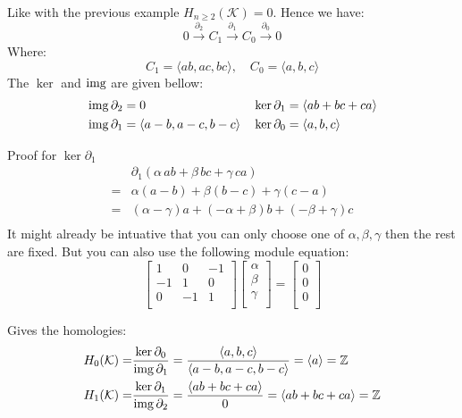 Like with the previous example $H_{n\geq 2}(\mathcal{K}) = 0$.
Hence we have:
\[0 \stackrel{\partial_2}{\longrightarrow} C_1 \stackrel{\partial_1}{\longrightarrow} C_0 \stackrel{\partial_0}{\longrightarrow} 0\]
Where:
\[C_1 = \langle ab,ac,bc \rangle,\quad C_0 = \langle a,b,c \rangle\]
The $\ker$ and $\operatorname{img}$ are given bellow:
\begin{equation*}
\begin{aligned}
	&\operatorname{img} \partial_2 = 0 && \ker \partial_1 = \langle ab+bc+ca\rangle\\
	&\operatorname{img} \partial_1 = \langle a-b,a-c,b-c\rangle && \ker \partial_0 = \langle a,b,c\rangle\\
\end{aligned}
\end{equation*}

Proof for $\ker \partial_1$
\begin{equation*}
\begin{aligned}
	&\partial_1(\alpha\,ab+\beta\,bc+\gamma\,ca)\\
	=&\alpha(a-b)+\beta(b-c)+\gamma(c-a) \\
	=&(\alpha-\gamma)a+(-\alpha+\beta)b+(-\beta + \gamma)c \\
\end{aligned}
\end{equation*}
It might already be intuative that you can only choose one of $\alpha,\beta,\gamma$ then the rest are fixed.
But you can also use the following module equation:
\[
	\begin{bmatrix}
		1&0&-1\\
		-1&1&0\\
		0&-1&1\\
	\end{bmatrix}
	\begin{bmatrix}
		\alpha\\
		\beta\\
		\gamma\\
	\end{bmatrix}
	=
	\begin{bmatrix}
		0\\0\\0\\
	\end{bmatrix}
\]

Gives the homologies:
\begin{equation*}
\begin{aligned}
	H_0(\mathcal{K}) =& \frac{\ker\partial_0}{\operatorname{img}\partial_1} = \frac{\langle a,b,c\rangle}{\langle a-b,a-c,b-c\rangle} = \langle a\rangle = \mathbb{Z}\\
	H_1(\mathcal{K}) =& \frac{\ker\partial_1}{\operatorname{img}\partial_2} = \frac{\langle ab+bc+ca\rangle}{0} =\langle ab+bc+ca\rangle =\mathbb{Z}\\
\end{aligned}
\end{equation*}

